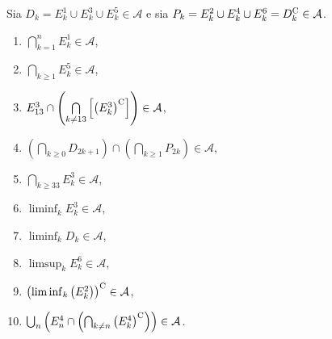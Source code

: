 \Soluzione

Sia $D_{k} =E_{k}^{1} \cup E_{k}^{3} \cup E_{k}^{5} \in \mathcal{A}$ e sia $P_{k} =E_{k}^{2} \cup E_{k}^{4} \cup E_{k}^{6} =D_{k}^{\mathrm{C}} \in \mathcal{A}$.
\begin{enumerate}
	\item $\bigcap\limits _{k=1}^{n} E_{k}^{1} \in \mathcal{A}$,
	\item $\bigcap\limits _{k\geq 1} E_{k}^{5} \in \mathcal{A}$,
	\item $E_{13}^{3} \cap \left(\bigcap\limits _{k\neq 13}\left[\left( E_{k}^{3}\right)^{\mathrm{C}}\right]\right) \in \mathcal{A}$,
	\item $\left(\bigcap\limits _{k\geq 0} D_{2k+1}\right) \cap \left(\bigcap\limits _{k\geq 1} P_{2k}\right) \in \mathcal{A}$,
	\item $\bigcap\limits _{k\geq 33} E_{k}^{3} \in \mathcal{A}$,
	\item $\liminf _{k} E_{k}^{3} \in \mathcal{A}$,
	\item $\liminf _{k} D_{k} \in \mathcal{A}$,
	\item $\limsup _{k} E_{k}^{6} \in \mathcal{A}$,
	\item $\left(\liminf _{k}\left( E_{k}^{2}\right)\right)^{\mathrm{C}} \in \mathcal{A}$,
	\item $\bigcup _{n}\left( E_{n}^{4} \cap \left(\bigcap _{k\neq n}\left( E_{k}^{4}\right)^{\mathrm{C}}\right)\right) \in \mathcal{A}$.
\end{enumerate}

\Soluzione

